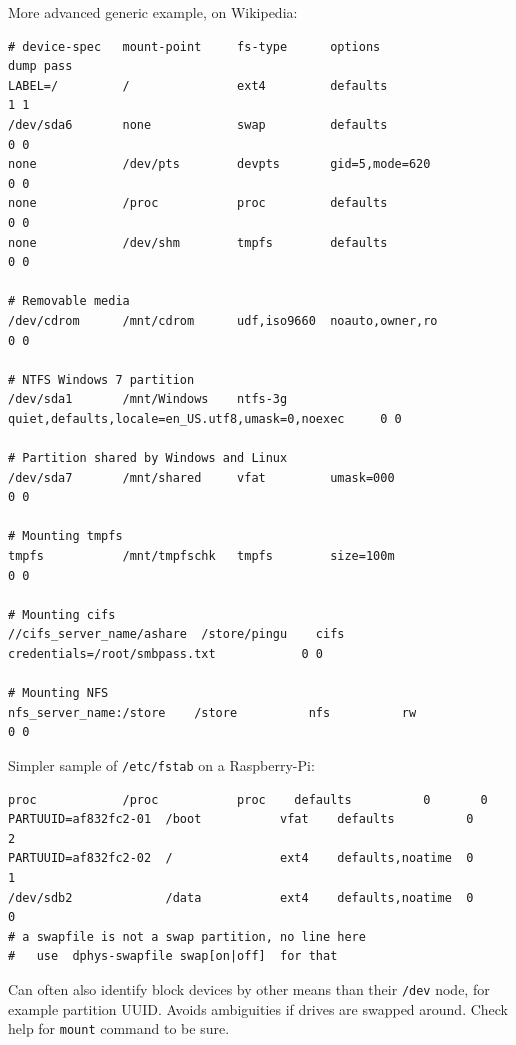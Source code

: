 More advanced generic example, on Wikipedia:

\begin{verbatim}
# device-spec   mount-point     fs-type      options                                          dump pass
LABEL=/         /               ext4         defaults                                            1 1
/dev/sda6       none            swap         defaults                                            0 0
none            /dev/pts        devpts       gid=5,mode=620                                      0 0
none            /proc           proc         defaults                                            0 0
none            /dev/shm        tmpfs        defaults                                            0 0

# Removable media
/dev/cdrom      /mnt/cdrom      udf,iso9660  noauto,owner,ro                                     0 0

# NTFS Windows 7 partition
/dev/sda1       /mnt/Windows    ntfs-3g      quiet,defaults,locale=en_US.utf8,umask=0,noexec     0 0

# Partition shared by Windows and Linux
/dev/sda7       /mnt/shared     vfat         umask=000                                           0 0

# Mounting tmpfs
tmpfs           /mnt/tmpfschk   tmpfs        size=100m                                           0 0

# Mounting cifs
//cifs_server_name/ashare  /store/pingu    cifs         credentials=/root/smbpass.txt            0 0

# Mounting NFS
nfs_server_name:/store    /store          nfs          rw                                        0 0
\end{verbatim}

Simpler sample of \texttt{/etc/fstab} on a Raspberry-Pi:

\begin{verbatim}
proc            /proc           proc    defaults          0       0
PARTUUID=af832fc2-01  /boot           vfat    defaults          0       2
PARTUUID=af832fc2-02  /               ext4    defaults,noatime  0       1
/dev/sdb2             /data           ext4    defaults,noatime  0       0
# a swapfile is not a swap partition, no line here
#   use  dphys-swapfile swap[on|off]  for that
\end{verbatim}

Can often also identify block devices by other means than their
\texttt{/dev} node, for example partition UUID. Avoids ambiguities if
drives are swapped around. Check help for \texttt{mount} command to be
sure.

